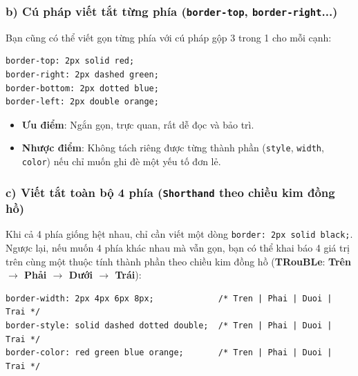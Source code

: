 \documentclass[11pt,oneside]{book}
\newcommand{\codeinline}[1]{\textcolor{accentOrange}{\texttt{#1}}}
\newcommand{\term}[1]{\textbf{\textcolor{primaryBlue}{#1}}}
\begin{document}
\subsubsection{b) Cú pháp viết tắt từng phía (\codeinline{border-top}, \codeinline{border-right}...)}

Bạn cũng có thể viết gọn từng phía với cú pháp gộp 3 trong 1 cho mỗi cạnh:

\begin{codeWindow}
\begin{lstlisting}[language=CSS3]
border-top: 2px solid red;
border-right: 2px dashed green;
border-bottom: 2px dotted blue;
border-left: 2px double orange;
\end{lstlisting}
\end{codeWindow}

\begin{itemize}[leftmargin=1.5em, itemsep=2.5pt, parsep=0pt]
    \item \textbf{Ưu điểm}: Ngắn gọn, trực quan, rất dễ đọc và bảo trì.
    \item \textbf{Nhược điểm}: Không tách riêng được từng thành phần (\codeinline{style}, \codeinline{width}, \codeinline{color}) nếu chỉ muốn ghi đè một yếu tố đơn lẻ.
\end{itemize}

\subsubsection{c) Viết tắt toàn bộ 4 phía (\codeinline{Shorthand} theo chiều kim đồng hồ)}

Khi cả 4 phía giống hệt nhau, chỉ cần viết một dòng \codeinline{border: 2px solid black;}. Ngược lại, nếu muốn 4 phía khác nhau mà vẫn gọn, bạn có thể khai báo 4 giá trị trên cùng một thuộc tính thành phần theo chiều kim đồng hồ (\term{TRouBLe}: \textbf{Trên $\rightarrow$ Phải $\rightarrow$ Dưới $\rightarrow$ Trái}):

\begin{codeWindow}
\begin{lstlisting}[language=CSS3]
border-width: 2px 4px 6px 8px;             /* Tren | Phai | Duoi | Trai */
border-style: solid dashed dotted double;  /* Tren | Phai | Duoi | Trai */
border-color: red green blue orange;       /* Tren | Phai | Duoi | Trai */
\end{lstlisting}
\end{codeWindow}
\end{document}

